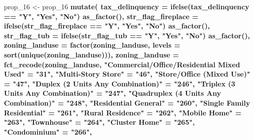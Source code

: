 \documentclass[]{book}
\newenvironment{Shaded}{\begin{snugshade}}{\end{snugshade}}
\newcommand{\KeywordTok}[1]{\textcolor[rgb]{0.13,0.29,0.53}{\textbf{#1}}}
\newcommand{\DataTypeTok}[1]{\textcolor[rgb]{0.13,0.29,0.53}{#1}}
\newcommand{\DecValTok}[1]{\textcolor[rgb]{0.00,0.00,0.81}{#1}}
\newcommand{\StringTok}[1]{\textcolor[rgb]{0.31,0.60,0.02}{#1}}
\newcommand{\OperatorTok}[1]{\textcolor[rgb]{0.81,0.36,0.00}{\textbf{#1}}}
\newcommand{\NormalTok}[1]{#1}
\theoremstyle{definition}
\theoremstyle{definition}
\theoremstyle{definition}
\theoremstyle{remark}
\begin{document}
\begin{Shaded}
\begin{Highlighting}[]
\NormalTok{prop_}\DecValTok{16}\NormalTok{ <-}\StringTok{ }\NormalTok{prop_}\DecValTok{16} \OperatorTok{%
\StringTok{  }\KeywordTok{mutate}\NormalTok{(}
    \DataTypeTok{tax_delinquency =} \KeywordTok{ifelse}\NormalTok{(tax_delinquency }\OperatorTok{==}\StringTok{ "Y"}\NormalTok{, }\StringTok{"Yes"}\NormalTok{, }\StringTok{"No"}\NormalTok{) }\OperatorTok{%
\StringTok{      }\KeywordTok{as_factor}\NormalTok{(),}
    \DataTypeTok{str_flag_fireplace =} \KeywordTok{ifelse}\NormalTok{(str_flag_fireplace }\OperatorTok{==}\StringTok{ "Y"}\NormalTok{, }\StringTok{"Yes"}\NormalTok{, }\StringTok{"No"}\NormalTok{) }\OperatorTok{%
\StringTok{      }\KeywordTok{as_factor}\NormalTok{(),}
    \DataTypeTok{str_flag_tub =} \KeywordTok{ifelse}\NormalTok{(str_flag_tub }\OperatorTok{==}\StringTok{ "Y"}\NormalTok{, }\StringTok{"Yes"}\NormalTok{, }\StringTok{"No"}\NormalTok{) }\OperatorTok{%
\StringTok{      }\KeywordTok{as_factor}\NormalTok{(),}
    \DataTypeTok{zoning_landuse =} \KeywordTok{factor}\NormalTok{(zoning_landuse, }\DataTypeTok{levels =} \KeywordTok{sort}\NormalTok{(}\KeywordTok{unique}\NormalTok{(zoning_landuse))),}
    \DataTypeTok{zoning_landuse =} \KeywordTok{fct_recode}\NormalTok{(zoning_landuse,}
      \StringTok{"Commercial/Office/Residential Mixed Used"}\NormalTok{ =}\StringTok{ "31"}\NormalTok{, }
      \StringTok{"Multi-Story Store"}\NormalTok{                        =}\StringTok{ "46"}\NormalTok{,}
      \StringTok{"Store/Office (Mixed Use)"}\NormalTok{                 =}\StringTok{ "47"}\NormalTok{,}
      \StringTok{"Duplex (2 Units Any Combination)"}\NormalTok{         =}\StringTok{ "246"}\NormalTok{,}
      \StringTok{"Triplex (3 Units Any Combination)"}\NormalTok{        =}\StringTok{ "247"}\NormalTok{,}
      \StringTok{"Quadruplex (4 Units Any Combination)"}\NormalTok{     =}\StringTok{ "248"}\NormalTok{,}
      \StringTok{"Residential General"}\NormalTok{                      =}\StringTok{ "260"}\NormalTok{,}
      \StringTok{"Single Family Residential"}\NormalTok{                =}\StringTok{ "261"}\NormalTok{,}
      \StringTok{"Rural Residence"}\NormalTok{                          =}\StringTok{ "262"}\NormalTok{,}
      \StringTok{"Mobile Home"}\NormalTok{                              =}\StringTok{ "263"}\NormalTok{,}
      \StringTok{"Townhouse"}\NormalTok{                                =}\StringTok{ "264"}\NormalTok{,}
      \StringTok{"Cluster Home"}\NormalTok{                             =}\StringTok{ "265"}\NormalTok{,}
      \StringTok{"Condominium"}\NormalTok{                              =}\StringTok{ "266"}\NormalTok{,}
}}}}
\end{Highlighting}
\end{Shaded}
\end{document}

